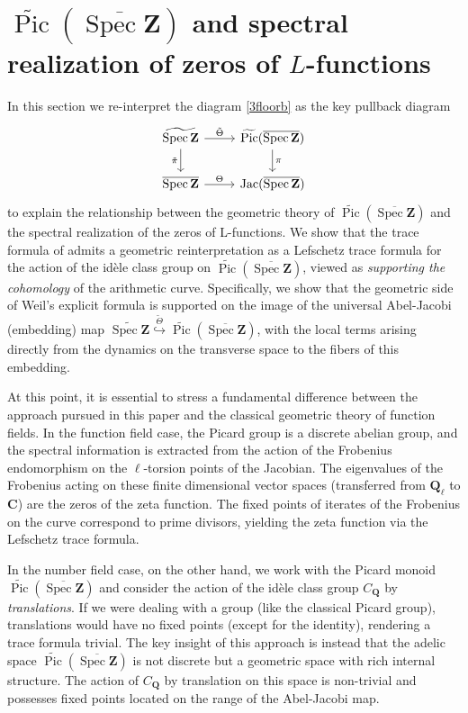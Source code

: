 \documentclass[11pt,a4paper]{article}
\newcommand{\Q}{\mathbf{Q}}
\newcommand{\Z}{\mathbf{Z}}
\newcommand{\C}{\mathbf{C}}
\def\spz{\Spec \Z}
\def\spzb{\overline{\Spec \Z}}
\newcommand{\Spec}{\operatorname{Spec}}
\def\Pic{\operatorname{Pic}}
\def\Jac{\operatorname{Jac}}
\def\tspz{\widetilde{\Pic}(\spzb)}
\def\spz{\Spec \Z}
\theoremstyle{plain}
\theoremstyle{definition} %
\begin{document}


\section{$\tspz$ and  spectral realization of zeros of $L$-functions}\label{Wtrace}

In this section we re-interpret the diagram \eqref{3floorb} as the key pullback diagram  
\begin{equation}\label{}
\begin{tikzcd}
\widetilde{\spz} \arrow[r,"\tilde\Theta"]\arrow[d,"\tilde\pi"'] & \tspz\arrow[d,"\pi"]
 \\
\spzb \arrow[r, "\Theta"] & \Jac(\spzb)
\end{tikzcd}
\end{equation} 
to explain the relationship between the geometric theory of  $\tspz$ and the spectral realization of the zeros of L-functions. We show that the trace formula of \cite{Co-zeta} admits a geometric reinterpretation as a Lefschetz trace formula for the action of the idèle class group on $\tspz$, viewed as \emph{supporting the cohomology} of the arithmetic curve.
Specifically, we show that the geometric side of Weil's explicit formula is supported on the image of the universal Abel-Jacobi (embedding) map $\widetilde{\spz} \stackrel{\tilde\Theta}{\hookrightarrow} \tspz$, with the local terms arising directly from the dynamics on the transverse space to the fibers of this embedding.\vspace{.03in}

At this point, it is essential to stress a fundamental difference between the approach pursued in this paper and the classical geometric theory of function fields.
In the function field case, the Picard group is a discrete abelian group, and the spectral information is extracted from the action of the Frobenius endomorphism on the $\ell$-torsion points of the Jacobian. The eigenvalues of the Frobenius acting on these finite dimensional vector spaces (transferred from $\Q_\ell$ to $\C$) are the zeros of the zeta function. The fixed points of iterates of the Frobenius on the curve correspond to prime divisors, yielding the zeta function via the Lefschetz trace formula.

In the number field case, on the other hand,  we work with the Picard monoid $\tspz$ and consider the action of the idèle class group $C_\Q$ by \emph{translations}.
If we were dealing with a  group (like the classical Picard group), translations would have no fixed points (except for the identity), rendering a trace formula trivial.
The key insight of this approach is instead that the adelic space $\tspz$ is not discrete  but a geometric space with rich internal structure. The action of $C_\Q$ by translation on this space is non-trivial and possesses  fixed points located on the range of the Abel-Jacobi map.
\end{document}
